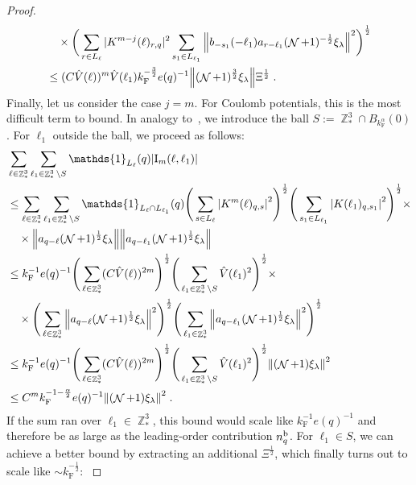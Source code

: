 \documentclass[12pt,a4paper]{article}
\numberwithin{equation}{section}
\newcommand{\1}{\mathbb{I}}
\renewcommand{\b}{\textnormal{b}}
\newcommand{\F}{\mathrm{F}}
\newcommand{\I}{\mathrm{I}}
\DeclareMathOperator{\Z}{\mathbb{Z}}
\DeclareMathOperator{\NN}{\mathcal{N}}
\newcommand{\half}{\frac{1}{2}}
\theoremstyle{plain}
\theoremstyle{definition}
\theoremstyle{remark}
\theoremstyle{plain}
\theoremstyle{definition}
\theoremstyle{remark}
\begin{document}
\begin{proof}
\begin{align}
		&\quad \times 
	\bigg(\sum\limits_{r\in L_{\ell}} |K^{m-j}(\ell)_{r,q} |^2
		\sum\limits_{s_1 \in L_{\ell_1}}\norm{ b_{-s_1}(-\ell_1) a_{r-\ell_1} (\NN+1)^{-\half}\xi_\lambda }^2\bigg)^\half
	\nonumber\\
	&\leq (C \hat{V}(\ell))^m
		\hat{V}(\ell_1)
		k_{\F}^{-\frac 32} e(q)^{-1}
		\norm{ (\NN+1)^{\frac 32}\xi_\lambda } \Xi^{\half} \;. \label{eq:estEQ2112}
\end{align}
\textcolor{green!30!black}{Finally, let us consider the case $ j = m $. For Coulomb potentials, this is the most difficult term to bound. In analogy to~\cite{CHN24}, we introduce the ball $ S := \Z^3_* \cap B_{k_{\F}^{\alpha}}(0) $. For $ \ell_1 $ outside the ball, we proceed as follows:
\begin{align}
	&\sum_{\ell \in \Z^3_*} \sum_{\ell_1 \in \Z^3_* \setminus S} \mathds{1}_{L_\ell}(q) |\I_m(\ell, \ell_1)| \nonumber\\
	&\leq \sum_{\ell \in \Z^3_*} \sum_{\ell_1 \in \Z^3_* \setminus S} \mathds{1}_{L_\ell \cap L_{\ell_1}}(q) \Bigg(\sum\limits_{s \in L_{\ell}} \abs{K^m(\ell)_{q,s}}^2\Bigg)^\half
		\Bigg(\sum\limits_{s_1 \in L_{\ell_1}} \abs{K(\ell_1)_{q,s_1}}^2\Bigg)^\half \times \nonumber \\
	& \quad \times \norm{ a_{q-\ell} (\NN+1)^{\half} \xi_\lambda}
		\norm{ a_{q-\ell_1} (\NN+1)^{\half} \xi_\lambda }\nonumber\\
	&\leq k_{\F}^{-1} e(q)^{-1}
		\Bigg( \sum_{\ell \in \Z^3_*} (C \hat{V}(\ell))^{2m} \Bigg)^{\half}
		\Bigg( \sum_{\ell_1 \in \Z^3_* \setminus S} \hat{V}(\ell_1)^2 \Bigg)^{\half} \times \nonumber \\
	& \quad \times 
		\Bigg( \sum_{\ell \in \Z^3_*} \norm{ a_{q-\ell} (\NN+1)^{\half} \xi_\lambda}^2 \Bigg)^{\half}
		\Bigg( \sum_{\ell_1 \in \Z^3_*} \norm{ a_{q-\ell_1} (\NN+1)^{\half} \xi_\lambda }^2 \Bigg)^{\half} \nonumber\\
	&\leq k_{\F}^{-1} e(q)^{-1}
		\Bigg( \sum_{\ell \in \Z^3_*} (C \hat{V}(\ell))^{2m} \Bigg)^{\half}
		\Bigg( \sum_{\ell_1 \in \Z^3_* \setminus S} \hat{V}(\ell_1)^2 \Bigg)^{\half} \norm{(\NN+1) \xi_\lambda}^2 \nonumber\\
	&\leq C^m k_{\F}^{-1-\frac{\alpha}{2}} e(q)^{-1}
		\norm{(\NN+1) \xi_\lambda}^2 \;. \label{eq:estEQ2113_Coulomb_1}
\end{align}
If the sum ran over $ \ell_1 \in \Z^3_* $, this bound would scale like $ k_{\F}^{-1} e(q)^{-1} $ and therefore be as large as the leading-order contribution $ n_q^{\b} $. For $ \ell_1 \in S $, we can achieve a better bound by extracting an additional $ \Xi^{\half} $, which finally turns out to scale like $ \sim k_{\F}^{-\half} $:
}
\end{proof}
\end{document}
